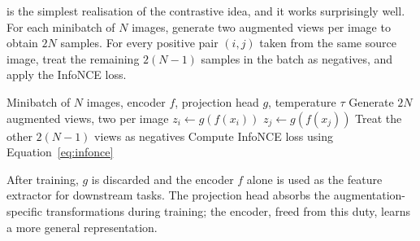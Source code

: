  is the simplest realisation of the contrastive idea, and it works surprisingly well.
For each minibatch of $N$ images, generate two augmented views per image to obtain $2N$ samples.
For every positive pair $(i, j)$ taken from the same source image, treat the remaining $2(N-1)$ samples in the batch as negatives, and apply the InfoNCE loss.

\begin{algorithm}[H]
\caption{SimCLR}
\begin{algorithmic}[1]
\Require Minibatch of $N$ images, encoder $f$, projection head $g$, temperature $\tau$
    \State Generate $2N$ augmented views, two per image
        \State $z_i \gets g(f(x_i))$ 
        \State $z_j \gets g(f(x_j))$
        \State Treat the other $2(N-1)$ views as negatives
        \State Compute InfoNCE loss using Equation~\ref{eq:infonce}
    \EndFor
\EndFor
\end{algorithmic}
\end{algorithm}

After training, $g$ is discarded and the encoder $f$ alone is used as the feature extractor for downstream tasks.
The projection head absorbs the augmentation-specific transformations during training; the encoder, freed from this duty, learns a more general representation.

